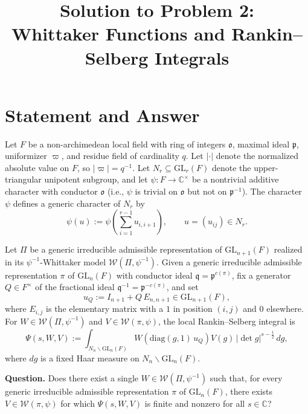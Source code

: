 \documentclass[12pt]{article}
\title{Solution to Problem 2:\\
Whittaker Functions and Rankin--Selberg Integrals}
\author{}
\date{}
\theoremstyle{definition}
\begin{document}
\maketitle

\section{Statement and Answer}

Let $F$ be a non-archimedean local field with ring of integers $\mathfrak{o}$, maximal ideal $\mathfrak{p}$, uniformizer $\varpi$, and residue field of cardinality $q$. Let $|\cdot|$ denote the normalized absolute value on $F$, so $|\varpi|=q^{-1}$. Let $N_r\subseteq\mathrm{GL}_r(F)$ denote the upper-triangular unipotent subgroup, and let $\psi:F\to\mathbb{C}^\times$ be a nontrivial additive character with conductor $\mathfrak{o}$ (i.e., $\psi$ is trivial on $\mathfrak{o}$ but not on $\mathfrak{p}^{-1}$). The character $\psi$ defines a generic character of $N_r$ by
\begin{equation}\label{eq:psi-gen}
\psi(u) := \psi\!\left(\sum_{i=1}^{r-1}u_{i,i+1}\right),\qquad u=(u_{ij})\in N_r.
\end{equation}

Let $\Pi$ be a generic irreducible admissible representation of $\mathrm{GL}_{n+1}(F)$ realized in its $\psi^{-1}$-Whittaker model $\mathcal{W}(\Pi,\psi^{-1})$. Given a generic irreducible admissible representation $\pi$ of $\mathrm{GL}_n(F)$ with conductor ideal $\mathfrak{q}=\mathfrak{p}^{c(\pi)}$, fix a generator $Q\in F^\times$ of the fractional ideal $\mathfrak{q}^{-1}=\mathfrak{p}^{-c(\pi)}$, and set
\begin{equation}\label{eq:uQ-def}
u_Q := I_{n+1}+Q\,E_{n,n+1}\in\mathrm{GL}_{n+1}(F),
\end{equation}
where $E_{i,j}$ is the elementary matrix with a $1$ in position $(i,j)$ and $0$ elsewhere. For $W\in\mathcal{W}(\Pi,\psi^{-1})$ and $V\in\mathcal{W}(\pi,\psi)$, the local Rankin--Selberg integral is
\begin{equation}\label{eq:RS-integral}
\Psi(s,W,V):=\int_{N_n\backslash\mathrm{GL}_n(F)}W\!\left(\mathrm{diag}(g,1)\,u_Q\right)V(g)\,|\det g|^{s-\tfrac12}\,dg,
\end{equation}
where $dg$ is a fixed Haar measure on $N_n\backslash\mathrm{GL}_n(F)$.

\medskip

\noindent\textbf{Question.} Does there exist a single $W\in\mathcal{W}(\Pi,\psi^{-1})$ such that, for every generic irreducible admissible representation $\pi$ of $\mathrm{GL}_n(F)$, there exists $V\in\mathcal{W}(\pi,\psi)$ for which $\Psi(s,W,V)$ is finite and nonzero for all $s\in\mathbb{C}$?
\end{document}

